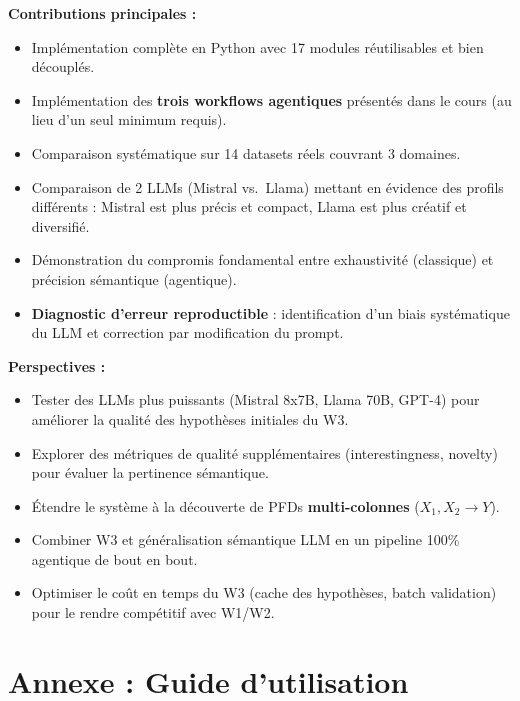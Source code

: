 \documentclass[12pt,a4paper]{article}
\begin{document}
\textbf{Contributions principales :}
\begin{itemize}
    \item Impl\'{e}mentation compl\`{e}te en Python avec 17 modules r\'{e}utilisables et bien d\'{e}coupl\'{e}s.
    \item Impl\'{e}mentation des \textbf{trois workflows agentiques} pr\'{e}sent\'{e}s dans le cours (au lieu d'un seul minimum requis).
    \item Comparaison syst\'{e}matique sur 14 datasets r\'{e}els couvrant 3 domaines.
    \item Comparaison de 2 LLMs (Mistral vs.\ Llama) mettant en \'{e}vidence des profils diff\'{e}rents : Mistral est plus pr\'{e}cis et compact, Llama est plus cr\'{e}atif et diversifi\'{e}.
    \item D\'{e}monstration du compromis fondamental entre exhaustivit\'{e} (classique) et pr\'{e}cision s\'{e}mantique (agentique).
    \item \textbf{Diagnostic d'erreur reproductible} : identification d'un biais syst\'{e}matique du LLM et correction par modification du prompt.
\end{itemize}

\textbf{Perspectives :}
\begin{itemize}
    \item Tester des LLMs plus puissants (Mistral 8x7B, Llama 70B, GPT-4) pour am\'{e}liorer la qualit\'{e} des hypoth\`{e}ses initiales du W3.
    \item Explorer des m\'{e}triques de qualit\'{e} suppl\'{e}mentaires (interestingness, novelty) pour \'{e}valuer la pertinence s\'{e}mantique.
    \item \'{E}tendre le syst\`{e}me \`{a} la d\'{e}couverte de PFDs \textbf{multi-colonnes} ($X_1, X_2 \rightarrow Y$).
    \item Combiner W3 et g\'{e}n\'{e}ralisation s\'{e}mantique LLM en un pipeline 100\% agentique de bout en bout.
    \item Optimiser le co\^{u}t en temps du W3 (cache des hypoth\`{e}ses, batch validation) pour le rendre comp\'{e}titif avec W1/W2.
\end{itemize}

\newpage
\appendix
\section{Annexe : Guide d'utilisation}
\end{document}
